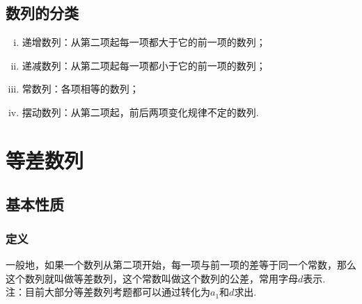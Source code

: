   \subsection{数列的分类}
        \begin{enumerate}[i)]
          \item 递增数列：从第二项起每一项都大于它的前一项的数列；
          \item 递减数列：从第二项起每一项都小于它的前一项的数列；
          \item 常数列：各项相等的数列；
          \item 摆动数列：从第二项起，前后两项变化规律不定的数列.
        \end{enumerate}
\section{等差数列}
  \subsection{基本性质}
    \subsubsection{定义}
      一般地，如果一个数列从第二项开始，每一项与前一项的差等于同一个常数，那么这个数列就叫做等差数列，这个常数叫做这个数列的公差，常用字母$ d $表示.\\
      {\kaishu 注：目前大部分等差数列考题都可以通过转化为$ a_1 $和$ d $求出.}
